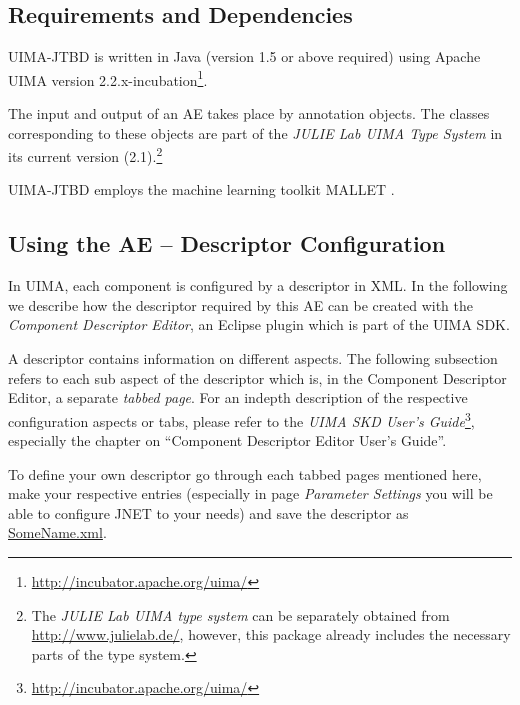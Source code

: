 \documentclass[11pt,a4paper,halfparskip]{scrartcl}
\begin{document}


\subsection{Requirements and Dependencies}

UIMA-JTBD is written in Java (version 1.5 or above required) using
Apache UIMA version
2.2.x-incubation\footnote{\url{http://incubator.apache.org/uima/}}.

The input and output of an AE takes place by annotation objects. The
classes corresponding to these objects are part of the \emph{JULIE Lab
  UIMA Type System} in its current version (2.1).\footnote{The
  \emph{JULIE Lab UIMA type system} can be separately obtained from
  \url{http://www.julielab.de/}, however, this package already
  includes the necessary parts of the type system.}

UIMA-JTBD employs the machine learning toolkit MALLET
\cite{McCallum2002}.




\subsection{Using the AE -- Descriptor Configuration}

In UIMA, each component is configured by a descriptor in XML. In the
following we describe how the descriptor required by this AE can be
created with the \emph{Component Descriptor Editor}, an Eclipse plugin
which is part of the UIMA SDK.

A descriptor contains information on different aspects. The following
subsection refers to each sub aspect of the descriptor which is, in
the Component Descriptor Editor, a separate \emph{tabbed page}. For an
indepth description of the respective configuration aspects or tabs,
please refer to the \emph{UIMA SKD User's
  Guide}\footnote{\url{http://incubator.apache.org/uima/}}, especially
the chapter on ``Component Descriptor Editor User's Guide''.

To define your own descriptor go through each tabbed pages mentioned
here, make your respective entries (especially in page \emph{Parameter
  Settings} you will be able to configure JNET to your needs) and save
the descriptor as \url{SomeName.xml}.
\end{document}

